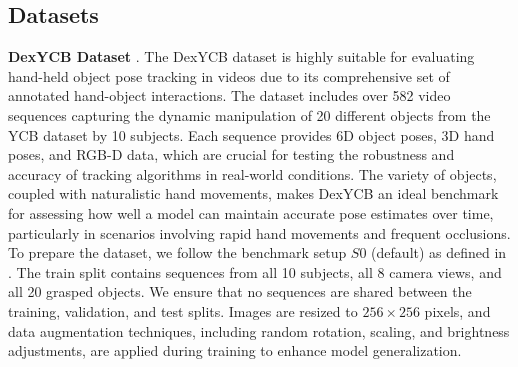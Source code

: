 \begin{figure}[h!]
\begin{subfigure}[b]{0.32\linewidth}
        \caption{}
    \end{subfigure}

    \caption{}

    \label{fig:compute_visibility_score}
\end{figure}

\DIFaddend \subsection{Datasets}

\textbf{DexYCB Dataset} \cite{chao2021dexycb}. The DexYCB dataset is highly suitable for evaluating hand-held object pose tracking in videos due to its comprehensive set of annotated hand-object interactions. The dataset includes over 582 video sequences capturing the dynamic manipulation of 20 different objects from the YCB dataset by 10 subjects. Each sequence provides 6D object poses, 3D hand poses, and RGB-D data, which are crucial for testing the robustness and accuracy of tracking algorithms in real-world conditions. The variety of objects, coupled with naturalistic hand movements, makes DexYCB an ideal benchmark for assessing how well a model can maintain accurate pose estimates over time, particularly in scenarios involving rapid hand movements and frequent occlusions. To prepare the dataset, we follow the benchmark setup $S0$ (default) as defined in \cite{chao2021dexycb}. The train split contains sequences from all 10 subjects, all 8 camera views, and all 20 grasped objects. We ensure that no sequences are shared between the training, validation, and test splits. Images are resized to $256 \times 256$ pixels, and data augmentation techniques, including random rotation, scaling, and brightness adjustments, are applied during training to enhance model generalization. 

